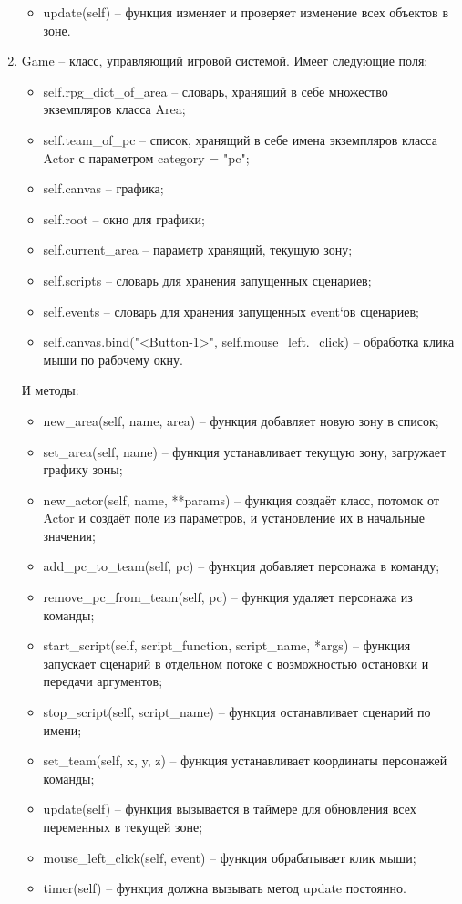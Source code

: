 \begin{enumerate}
\begin{itemize}
			\item update(self) -- функция изменяет и проверяет изменение всех объектов в зоне.
		\end{itemize}
	\item Game -- класс, управляющий игровой системой. Имеет следующие поля:
		\begin{itemize}
			\item self.rpg\_dict\_of\_area -- словарь, хранящий в себе множество экземпляров класса Area;
			\item self.team\_of\_pc -- список, хранящий в себе имена экземпляров класса Actor с параметром category = "pc";
			\item self.canvas -- графика;
			\item self.root -- окно для графики;
			\item self.current\_area -- параметр хранящий, текущую зону;
			\item self.scripts -- словарь для хранения запущенных сценариев;
			\item self.events -- словарь для хранения запущенных event`ов сценариев;
			\item self.canvas.bind("<Button-1>", self.mouse\_left.\_click) -- обработка клика мыши по рабочему окну.
		\end{itemize}
		И методы:
		\begin{itemize}
			\item new\_area(self, name, area) -- функция добавляет новую зону в список;
			\item set\_area(self, name) -- функция устанавливает текущую зону, загружает графику зоны;
			\item new\_actor(self, name, **params) -- функция создаёт класс, потомок от Actor и создаёт поле из параметров, и установление их в начальные значения;
			\item add\_pc\_to\_team(self, pc) -- функция добавляет персонажа в команду;
			\item remove\_pc\_from\_team(self, pc) -- функция удаляет персонажа из команды;
			\item start\_script(self, script\_function, script\_name, *args) -- функция запускает сценарий в отдельном потоке с возможностью остановки и передачи аргументов;
			\item stop\_script(self, script\_name) -- функция останавливает сценарий по имени;
			\item set\_team(self, x, y, z) -- функция устанавливает координаты персонажей команды;
			\item update(self) -- функция вызывается в таймере для обновления всех переменных в текущей зоне;
			\item mouse\_left\_click(self, event) -- функция обрабатывает клик мыши;
			\item timer(self) -- функция должна вызывать метод update постоянно.
		\end{itemize}
\end{enumerate}

